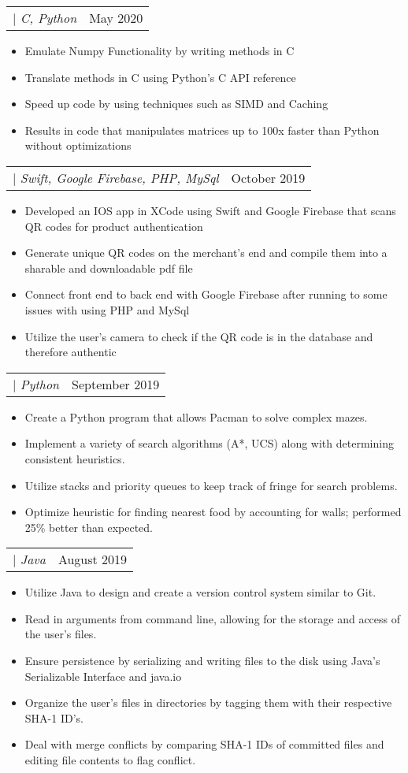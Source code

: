 \documentclass[a4paper,11pt]{article}
\makeatletter
\newcommand{\myuline}[1]{%
  \uline{\phantom{#1}}%
  \llap{\contour{white}{#1}}%
}
\newcommand{\resumeItem}[1]{
  \item\small{
    {#1 \vspace{-2pt}}
  }
}
\newcommand{\resumeProjectHeading}[2]{
    \item
    \begin{tabular*}{0.97\textwidth}{l@{\extracolsep{\fill}}r}
      \small#1 & #2 \\
    \end{tabular*}\vspace{-7pt}
}
\newcommand{\resumeItemListStart}{\begin{itemize}}
\newcommand{\resumeItemListEnd}{\end{itemize}\vspace{-5pt}}
\makeatother
\begin{document}
      \resumeProjectHeading
          {\href{}{\myuline{\textbf{NumC}}} $|$ \textit{C, Python}}{May 2020}
          \resumeItemListStart
            \resumeItem{Emulate Numpy Functionality by writing methods in C}
            \resumeItem{Translate methods in C using Python’s C API reference}
            \resumeItem{Speed up code by using techniques such as SIMD and Caching}
            \resumeItem{Results in code that manipulates matrices up to 100x faster than Python without optimizations}
          \resumeItemListEnd
          
      \resumeProjectHeading
          {\href{}{\myuline{\textbf{Honest}}} $|$ \textit{Swift, Google Firebase, PHP, MySql}}{October 2019}
          \resumeItemListStart
            \resumeItem{Developed an IOS app in XCode using Swift and Google Firebase that scans QR codes for product authentication}
            \resumeItem{Generate unique QR codes on the merchant’s end and compile them into a sharable and downloadable pdf file}
            \resumeItem{Connect front end to back end with Google Firebase after running to some issues with using PHP and MySql}
            \resumeItem{Utilize the user’s camera to check if the QR code is in the database and therefore authentic}
          \resumeItemListEnd
          
      \resumeProjectHeading
          {\href{}{\myuline{\textbf{Pacman AI}}} $|$ \textit{Python}}{September 2019}
          \resumeItemListStart
            \resumeItem{Create a Python program that allows Pacman to solve complex mazes.}
            \resumeItem{Implement a variety of search algorithms (A*, UCS) along with determining consistent heuristics.}
            \resumeItem{Utilize stacks and priority queues to keep track of fringe for search problems.}
            \resumeItem{Optimize heuristic for finding nearest food by accounting for walls; performed 25\% better than expected.}
          \resumeItemListEnd
          
        \resumeProjectHeading
          {\href{}{\myuline{\textbf{Gitlet: Version Control System}}} $|$ \textit{Java}}{August 2019}
          \resumeItemListStart
            \resumeItem{Utilize Java to design and create a version control system similar to Git.}
            \resumeItem{Read in arguments from command line, allowing for the storage and access of the user’s files.}
            \resumeItem{Ensure persistence by serializing and writing files to the disk using Java’s Serializable Interface and java.io}
            \resumeItem{Organize the user’s files in directories by tagging them with their respective SHA-1 ID’s.}
            \resumeItem{Deal with merge conflicts by comparing SHA-1 IDs of committed files and editing file contents to flag conflict.}
          \resumeItemListEnd 
      
\end{document}
